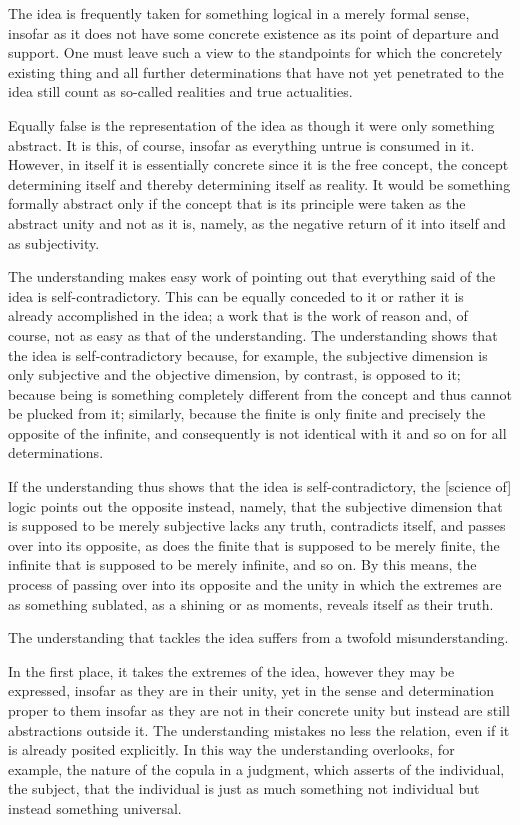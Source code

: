 The idea is frequently taken for something logical in a merely formal sense,
insofar as it does not have some concrete existence
as its point of departure and support.
One must leave such a view to the standpoints for which
the concretely existing thing and all further determinations
that have not yet penetrated to the idea still count as
so-called realities and true actualities.

Equally false is the representation of the idea
as though it were only something abstract.
It is this, of course, insofar as everything untrue is consumed in it.
However, in itself it is essentially concrete since it is the free concept,
the concept determining itself and thereby determining itself as reality.
It would be something formally abstract only if
the concept that is its principle were taken as
the abstract unity and not as it is, namely,
as the negative return of it into itself and as subjectivity.

The understanding makes easy work of pointing out
that everything said of the idea is self-contradictory.
This can be equally conceded to it or
rather it is already accomplished in the idea;
a work that is the work of reason and, of course,
not as easy as that of the understanding.
The understanding shows that the idea is self-contradictory because,
for example, the subjective dimension is only subjective
and the objective dimension, by contrast, is opposed to it;
because being is something completely different from
the concept and thus cannot be plucked from it;
similarly, because the finite is only finite and
precisely the opposite of the infinite, and
consequently is not identical with it and so on for all determinations.

If the understanding thus shows that the idea is self-contradictory,
the [science of] logic points out the opposite instead, namely,
that the subjective dimension that is supposed to be merely subjective
lacks any truth, contradicts itself, and passes over into its opposite,
as does the finite that is supposed to be merely finite,
the infinite that is supposed to be merely infinite, and so on.
By this means, the process of passing over into its opposite and
the unity in which the extremes are as something sublated,
as a shining or as moments, reveals itself as their truth.

The understanding that tackles the idea
suffers from a twofold misunderstanding.

In the first place, it takes the extremes of the idea,
however they may be expressed, insofar as they are in their unity,
yet in the sense and determination proper to them insofar as they are not
in their concrete unity but instead are still abstractions outside it.
The understanding mistakes no less the relation,
even if it is already posited explicitly.
In this way the understanding overlooks, for example,
the nature of the copula in a judgment,
which asserts of the individual, the subject,
that the individual is just as much something
not individual but instead something universal.

